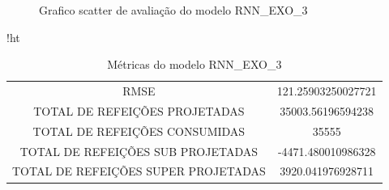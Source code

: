 \documentclass[	12pt, Times, openright, twoside, a4paper, english, brazil]{abntex2}
\begin{document}
                \begin{figure}[H]
                \end{figure}
                \begin{figure}[H]
                  \caption{Grafico scatter de avaliação do modelo RNN\_EXO\_3 \label{fig:case1_rnn_exo_3_val_scatter} }
                \end{figure}
                
                
                 \begin{table}{!ht}
                \centering
                \caption{Métricas do modelo  RNN\_EXO\_3 }
                 \begin{tabular}{|c|c|}
                     \rowcolor{gray!50}
                     \hline
                     \multicolumn{2}{c}{ METRICAS DO MODELO RNN\_EXO\_3 : } \\ \hline
                        RMSE & 121.25903250027721\\
                        TOTAL DE REFEIÇÕES PROJETADAS & 35003.56196594238\\
                        TOTAL DE REFEIÇÕES CONSUMIDAS &  35555\\
                        TOTAL DE REFEIÇÕES SUB PROJETADAS & -4471.480010986328\\
                        TOTAL DE REFEIÇÕES SUPER PROJETADAS & 3920.041976928711 \\ \hline 
                \end{tabular} \end{table}
        \newpage
        
\end{document}
